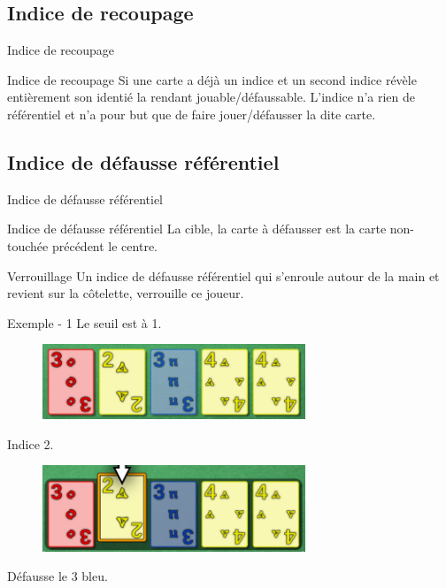 \documentclass{beamer}
\begin{document}
\subsection{Indice de recoupage}
\begin{frame}{Indice de recoupage}
    \begin{block}{Indice de recoupage}
        Si une carte a déjà un indice et un second indice révèle entièrement
        son identié la rendant jouable/défaussable. L'indice n'a rien de
        référentiel et n'a pour but que de faire jouer/défausser la dite
        carte.
    \end{block}
\end{frame}

\subsection{Indice de défausse référentiel}
\begin{frame}{Indice de défausse référentiel}
    \begin{block}{Indice de défausse référentiel}
        La cible, la carte à défausser est la carte non-touchée précédent le
        centre.
    \end{block}
    \begin{block}{Verrouillage}
        Un indice de défausse référentiel qui s'enroule autour de la main et
        revient sur la côtelette, verrouille ce joueur.
    \end{block}
\end{frame}

\begin{frame}{Exemple - 1}
    Le seuil est à 1.
    \begin{figure}[h]
        \includegraphics[width=0.7\textwidth]{ref_discard_before.png}
    \end{figure}
    Indice 2.
    \begin{figure}[h]
        \includegraphics[width=0.7\textwidth]{ref_discard_after.png}
    \end{figure}
    Défausse le 3 bleu.
\end{frame}
\end{document}

